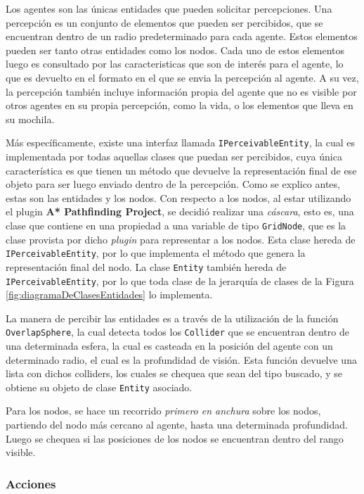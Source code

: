 \documentclass[a4paper,oneside]{article}
\begin{document}
Los agentes son las únicas entidades que pueden solicitar percepciones. Una
percepción es un conjunto de elementos que pueden ser percibidos, que se
encuentran dentro de un radio predeterminado para cada agente. Estos elementos
pueden ser tanto otras entidades como los nodos. Cada uno de estos elementos
luego es consultado por las caracteristicas que son de interés para el agente,
lo que es devuelto en el formato en el que se envia la percepción al agente.
A su vez, la percepción también incluye información propia del agente que no es
visible por otros agentes en su propia percepción, como la vida, o los elementos
que lleva en su mochila.

Más específicamente, existe una interfaz llamada \texttt{IPerceivableEntity}, la
cual es implementada por todas aquellas clases que puedan ser percibidos, cuya
única característica es que tienen un método que devuelve la representación
final de ese objeto para ser luego enviado dentro de la percepción. Como se
explico antes, estas son las entidades y los nodos. Con respecto a los nodos, al
estar utilizando el plugin \textbf{A* Pathfinding Project}, se decidió realizar
una \textit{cáscara}, esto es, una clase que contiene en una propiedad a una
variable de tipo \texttt{GridNode}, que es la clase provista por dicho
\textit{plugin} para representar a los nodos. Esta clase hereda de
\texttt{IPerceivableEntity}, por lo que implementa el método que genera la
representación final del nodo. La clase \texttt{Entity} también hereda de
\texttt{IPerceivableEntity}, por lo que toda clase de la jerarquía de clases de
la Figura \ref{fig:diagramaDeClasesEntidades} lo implementa.

La manera de percibir las entidades es a través de la utilización de la función
\texttt{OverlapSphere}, la cual detecta todos los \texttt{Collider} que se
encuentran dentro de una determinada esfera, la cual es casteada en la posición
del agente con un determinado radio, el cual es la profundidad de visión. Esta
función devuelve una lista con dichos colliders, los cuales se chequea que sean
del tipo buscado, y se obtiene su objeto de clase \texttt{Entity} asociado. 

Para los nodos, se hace un recorrido \textit{primero en anchura} sobre los
nodos, partiendo del nodo más cercano al agente, hasta una determinada
profundidad. Luego se chequea si las posiciones de los nodos se encuentran
dentro del rango visible.

\subsubsection{Acciones}
\end{document}
